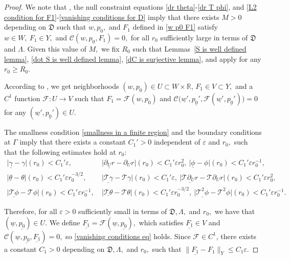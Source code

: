 \documentclass[11pt]{article}
\numberwithin{equation}{section}
\begin{document}
\begin{proof}
    We note that , the null constraint equations \eqref{dr theta}-\eqref{dr T phi}, and \eqref{L2 condition for F1}-\eqref{vanishing conditions for D} imply that there exists $M>0$ depending on $\mathfrak{D}$ such that $w,p_0,$ and $F_1$ defined in \eqref{w p0 F1} satisfy  $w\in W,\ F_1\in Y,$ and $\mathcal{C}(w,p_0,F_1)=0,$ for all $r_0$ sufficiently large in terms of $\mathfrak{D}$ and $\Lambda$. Given this value of $M,$ we fix $R_0$ such that Lemmas~\ref{S is well defined lemma}, \ref{dot S is well defined lemma}, \ref{dC is surjective lemma}, and  apply for any $r_0\geq R_0$.
    
    According to , we get neighborhoods $(w,p_0)\in U\subset W\times\mathbb{R}$, $F_1\in V\subset Y,$ and a $C^1$ function $\mathcal{F}:U\rightarrow V$ such that $F_1=\mathcal{F}(w,p_0)$ and  $\mathcal{C}\big(\underline{w'},\underline{p_0'},\mathcal{F}(\underline{w'},\underline{p_0'})\big)=0$ for any $(\underline{w'},\underline{p_0'})\in U.$

    The smallness condition \eqref{smallness in a finite region} and the boundary conditions at $\Gamma$ imply that there exists a constant $C_1'>0$ independent of $\varepsilon$ and $r_0,$ such that the following estimates hold at $r_0:$
    \begin{align}
        \big|\underline{\gamma}-\gamma\big|(r_0)<C_1'\varepsilon,\ &\big|\underline{\partial_Ur}-\partial_Ur\big|(r_0)<C_1'\varepsilon r_0^2,\ \big|\underline{\phi}-\phi\big|(r_0)<C_1'\varepsilon r_0^{-1},\\ \big|\underline{\theta}-\theta\big|(r_0)<C_1'\varepsilon r_0^{-3/2},\
        &\big|\underline{\mathcal{T}\gamma}-\mathcal{T}\gamma\big|(r_0)<C_1'\varepsilon,\ \big|\underline{\mathcal{T}\partial_Ur}-\mathcal{T}\partial_Ur\big|(r_0)<C_1'\varepsilon r_0^2,\\ \big|\underline{\mathcal{T}\phi}-\mathcal{T}\phi\big|(r_0)<C_1'\varepsilon r_0^{-1},\ &\big|\underline{\mathcal{T}\theta}-\mathcal{T}\theta\big|(r_0)<C_1'\varepsilon r_0^{-3/2},\ \big|\underline{\mathcal{T}^2\phi}-\mathcal{T}^2\phi\big|(r_0)<C_1'\varepsilon r_0^{-1}.
    \end{align}
    
    Therefore, for all $\varepsilon>0$ sufficiently small in terms of $\mathfrak{D},\Lambda,$ and $r_0,$ we have that $(\underline{w},\underline{p_0})\in U$. We define $\underline{F_1}=\mathcal{F}(\underline{w},\underline{p_0}),$ which satisfies $\underline{F_1}\in V$ and $\mathcal{C}(\underline{w},\underline{p_0},\underline{F_1})=0,$ so \eqref{vanishing conditions eq} holds. Since $\mathcal{F}\in C^1$, there exists a constant $C_1>0$ depending on $\mathfrak{D},\Lambda,$ and $r_0,$ such that $\|\underline{F_1}-F_1\|_{Y}\leq C_1\varepsilon.$ 
\end{proof}
\end{document}
